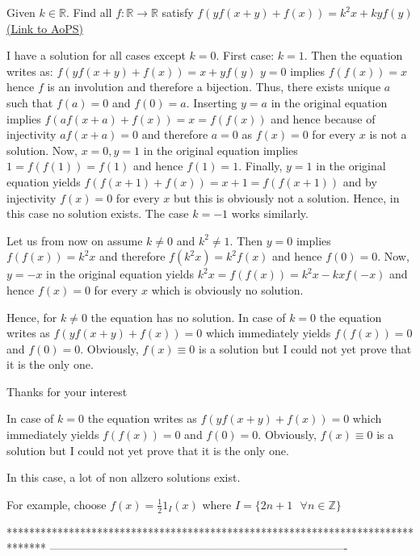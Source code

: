 \begin{problem}
	Given $ k \in \mathbb{R} $. Find all $ f: \mathbb{R} \longrightarrow \mathbb{R} $ 
satisfy $ f(yf(x+y)+f(x))=k^2x+kyf(y) $
	\flushright \href{https://artofproblemsolving.com/community/c6h618365}{(Link to AoPS)}
\end{problem}



\begin{solution}
	I have a solution for all cases except $k=0$.
First case: $k=1$. Then the equation writes as:
$f(yf(x+y)+f(x))=x+yf(y)$
$y=0$ implies $f(f(x))=x$ hence $f$ is an involution and therefore a bijection.
Thus, there exists unique $a$ such that $f(a)=0$ and $f(0)=a$.
Inserting $y=a$ in the original equation implies $f(af(x+a)+f(x))=x=f(f(x))$ and hence because of injectivity $af(x+a)=0$ and therefore $a=0$ as $f(x)=0$ for every $x$ is not a solution.
Now, $x=0, y=1$ in the original equation implies $1=f(f(1))=f(1)$ and hence $f(1)=1$.
Finally, $y=1$ in the original equation yields $f(f(x+1)+f(x))=x+1=f(f(x+1))$ and by injectivity $f(x)=0$ for every $x$ but this is obviously not a solution. Hence, in this case no solution exists.
The case $k=-1$ works similarly.

Let us from now on assume $k \ne 0$ and $k^2 \ne 1$.
Then $y=0$ implies $f(f(x))=k^2x$ and therefore $f(k^2x)=k^2f(x)$ and hence $f(0)=0$.
Now, $y=-x$ in the original equation yields $k^2x=f(f(x))=k^2x-kxf(-x)$ and hence $f(x)=0$ for every $x$ which is obviously no solution.

Hence, for $k \ne 0$ the equation has no solution.
In case of $k=0$ the equation writes as $f(yf(x+y)+f(x))=0$ which immediately yields $f(f(x))=0$ and $f(0)=0$. Obviously, $f(x) \equiv 0$ is a solution but I could not yet prove that it is the only one.
\end{solution}



\begin{solution}
	Thanks for your interest
\end{solution}



\begin{solution}
	\begin{tcolorbox}In case of $k=0$ the equation writes as $f(yf(x+y)+f(x))=0$ which immediately yields $f(f(x))=0$ and $f(0)=0$. Obviously, $f(x) \equiv 0$ is a solution but I could not yet prove that it is the only one.\end{tcolorbox}
In this case, a lot of non allzero solutions exist.

For example, choose $f(x)=\frac 121_I(x)$ where $I=\{2n+1\text{  }\forall n\in\mathbb Z\}$
\end{solution}
*******************************************************************************
-------------------------------------------------------------------------------

